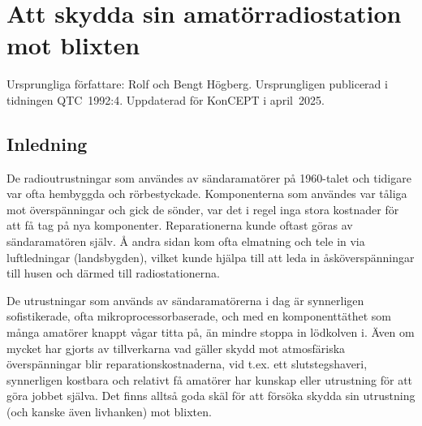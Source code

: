 \chapter{Att skydda sin amatörradiostation mot blixten}
\label{app:aaskskydd}

Ursprungliga författare: Rolf och Bengt Högberg.
Ursprungligen publicerad i tidningen QTC~1992:4.
Uppdaterad för KonCEPT i april~2025.

\section{Inledning}
De radioutrustningar som användes av sändaramatörer på 1960-talet och tidigare
var ofta hembyggda och rörbestyckade.
Komponenterna som användes var tåliga mot överspänningar och gick de sönder, var
det i regel inga stora kostnader för att få tag på nya komponenter.
Reparationerna kunde oftast göras av sändaramatören själv.
Å andra sidan kom ofta elmatning och tele in via luftledningar (landsbygden),
vilket kunde hjälpa till att leda in åsköverspänningar till husen och därmed
till radiostationerna.

De utrustningar som används av sändaramatörerna i dag är synnerligen
sofistikerade, ofta mikroprocessorbaserade, och med en komponenttäthet som många
amatörer knappt vågar titta på, än mindre stoppa in lödkolven i.
Även om mycket har gjorts av tillverkarna vad gäller skydd mot atmosfäriska
överspänningar blir reparationskostnaderna, vid t.ex. ett slutstegshaveri,
synnerligen kostbara och relativt få amatörer har kunskap eller utrustning för
att göra jobbet själva.
Det finns alltså goda skäl för att försöka skydda sin utrustning (och kanske
även livhanken) mot blixten.


